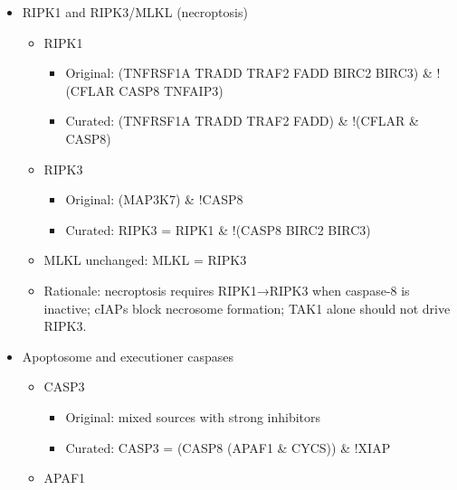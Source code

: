 \begin{itemize}
  \begin{itemize}
  \tightlist
  \item
    Original: BIRC2/3 activated broadly and also drove RIPK1
  \item
    Curated: BIRC2 = (NFKB1 \textbar{} RELA), BIRC3 = (NFKB1 \textbar{}
    RELA)
  \item
    Rationale: cIAPs are NF-κB targets; they stabilize complex I and
    suppress necrosome.
  \end{itemize}
\item
  RIPK1 and RIPK3/MLKL (necroptosis)

  \begin{itemize}
  \tightlist
  \item
    RIPK1

    \begin{itemize}
    \tightlist
    \item
      Original: (TNFRSF1A \textbar{} TRADD \textbar{} TRAF2 \textbar{}
      FADD \textbar{} BIRC2 \textbar{} BIRC3) \& !(CFLAR \textbar{}
      CASP8 \textbar{} TNFAIP3)
    \item
      Curated: (TNFRSF1A \textbar{} TRADD \textbar{} TRAF2 \textbar{}
      FADD) \& !(CFLAR \& CASP8)
    \end{itemize}
  \item
    RIPK3

    \begin{itemize}
    \tightlist
    \item
      Original: (MAP3K7) \& !CASP8
    \item
      Curated: RIPK3 = RIPK1 \& !(CASP8 \textbar{} BIRC2 \textbar{}
      BIRC3)
    \end{itemize}
  \item
    MLKL unchanged: MLKL = RIPK3
  \item
    Rationale: necroptosis requires RIPK1→RIPK3 when caspase-8 is
    inactive; cIAPs block necrosome formation; TAK1 alone should not
    drive RIPK3.
  \end{itemize}
\item
  Apoptosome and executioner caspases

  \begin{itemize}
  \tightlist
  \item
    CASP3

    \begin{itemize}
    \tightlist
    \item
      Original: mixed sources with strong inhibitors
    \item
      Curated: CASP3 = (CASP8 \textbar{} (APAF1 \& CYCS)) \& !XIAP
    \end{itemize}
  \item
    APAF1


\end{itemize}
\end{itemize}
